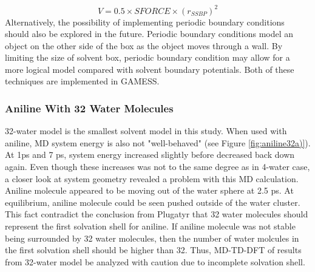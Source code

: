 \documentclass[
journal=jpcbfk, %
manuscript=article]{achemso}
\begin{document}
		\begin{equation}
		\label{eq:ssbp}
		V=0.5\times SFORCE\times (r_{SSBP})^{2}
		\end{equation}	
	Alternatively, the possibility of implementing periodic boundary conditions\cite{Makov1995} should also be explored in the future. Periodic boundary conditions model an object on the other side of the box as the object moves through a wall. By limiting the size of solvent box, periodic boundary condition may allow for a more logical model compared with solvent boundary potentials. Both of these techniques are implemented in GAMESS.
		

	\subsubsection{Aniline With 32 Water Molecules}
 32-water model is the smallest solvent model in this study. When used with aniline, MD system energy is also not "well-behaved" (see Figure \ref{fig:aniline32a)}). At 1ps and 7 ps, system energy increased slightly before decreased back down again. Even though these increases was not to the same degree as in 4-water case, a closer look at system geometry revealed a problem with this MD calculation. Aniline molecule appeared to be moving out of the water sphere at 2.5 ps. At equilibrium, aniline molecule could be seen pushed outside of the water cluster. This fact contradict the conclusion from Plugatyr that 32 water molecules should represent the first solvation shell for aniline.\cite{Plugatyr2009} If aniline molecule was not stable being surrounded by 32 water molecules, then the number of water molcules in the first solvation shell should be higher than 32. Thus, MD-TD-DFT of results from 32-water model be analyzed with caution due to incomplete solvation shell.
\end{document}
